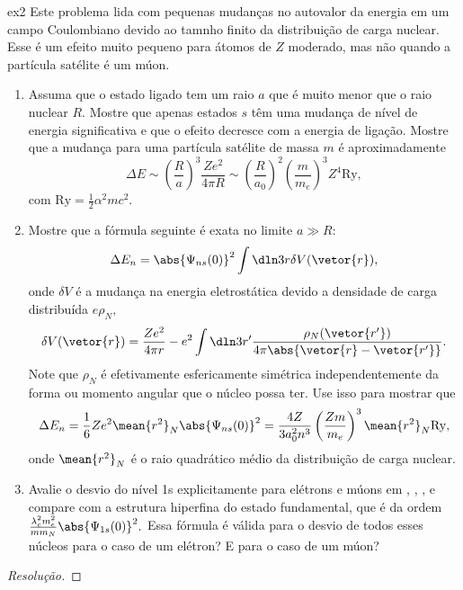 \begin{exercício}{}{ex2}
   Este problema lida com pequenas mudanças no autovalor da energia em um campo Coulombiano devido ao tamnho finito da distribuição de carga nuclear. Esse é um efeito muito pequeno para átomos de \(Z\) moderado, mas não quando a partícula satélite é um múon.
   \begin{enumerate}[label=(\alph*)]
         \item Assuma que o estado ligado tem um raio \(a\) que é muito menor que o raio nuclear \(R.\) Mostre que apenas estados \(s\) têm uma mudança de nível de energia significativa e que o efeito decresce com a energia de ligação. Mostre que a mudança para uma partícula satélite de massa \(m\) é aproximadamente
            \begin{equation*}
               \Delta E \sim \left(\frac{R}{a}\right)^3 \frac{Z e^2}{4\pi R} \sim \left(\frac{R}{a_0}\right)^2 \left(\frac{m}{m_e}\right)^3 Z^4 \mathrm{Ry},
            \end{equation*}
            com \(\mathrm{Ry} = \frac12 \alpha^2 m c^2.\)
         \item Mostre que a fórmula seguinte é exata no limite \(a \gg R\):
            \begin{equation*}
               \Delta E_n = \abs{\Psi_{ns}(0)}^2 \int \dln3r \delta V(\vetor{r}),
            \end{equation*}
            onde \(\delta V\) é a mudança na energia eletrostática devido a densidade de carga distribuída \(e \rho_N,\)
            \begin{equation*}
               \delta V(\vetor{r}) = \frac{Z e^2}{4\pi r} - e^2 \int \dln3{r'} \frac{\rho_N(\vetor{r'})}{4\pi \abs{\vetor{r} - \vetor{r'}}}.
            \end{equation*}
            Note que \(\rho_N\) é efetivamente esfericamente simétrica independentemente da forma ou momento angular que o núcleo possa ter. Use isso para mostrar que
            \begin{equation*}
               \Delta E_n = \frac16 Z e^2 \mean{r^2}_N \abs{\Psi_{ns}(0)}^2 = \frac{4 Z}{3a_0^2n^3}\left(\frac{Z m}{m_e}\right)^3 \mean{r^2}_N \mathrm{Ry},
            \end{equation*}
            onde \(\mean{r^2}_N\) é o raio quadrático médio da distribuição de carga nuclear.
         \item Avalie o desvio do nível 1s explicitamente para elétrons e múons em , , , e compare com a estrutura hiperfina do estado fundamental, que é da ordem \(\frac{\lambda_c^2 m_e^2}{mm_N}\abs{\Psi_{1s}(0)}^2.\) Essa fórmula é válida para o desvio de todos esses núcleos para o caso de um elétron? E para o caso de um múon?
   \end{enumerate}
\end{exercício}
\begin{proof}[Resolução]
    
\end{proof}
